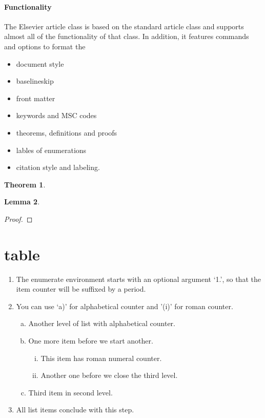 \documentclass[review,number,sort&compress,3p,twocolumn,11pt]{elsarticle} %
\newtheorem{thm}{Theorem}  %
\newtheorem{lem}[thm]{Lemma} %
\begin{document}
\paragraph{Functionality} The Elsevier article class is based on the standard article class and supports almost all of the functionality of that class. In addition, it features commands and options to format the
\begin{itemize}
\item document style
\item baselineskip
\item front matter
\item keywords and MSC codes
\item theorems, definitions and proofs
\item lables of enumerations
\item citation style and labeling.
\end{itemize}
 
\begin{thm}\label{CUMT}
	\lipsum[1]
\end{thm} 


\begin{lem}
	\lipsum[1]
\end{lem} 

\begin{dfn}
	\lipsum[2]
\end{dfn} 	

\begin{rmk}
	\lipsum[2]
\end{rmk} 

\begin{proof}
	\lipsum[2]
\end{proof}

\section{table}
	\begin{enumerate}[1.]
		\item The enumerate environment starts with an optional
		argument ‘1.’, so that the item counter will be suffixed
		by a period.
		\item You can use ‘a)’ for alphabetical counter and ’(i)’ for
		roman counter.
		\begin{enumerate}[a)]
			\item Another level of list with alphabetical counter.
			\item One more item before we start another.
			\begin{enumerate}[(i)]
				\item This item has roman numeral counter.
				\item Another one before we close the third level.
			\end{enumerate}
			\item Third item in second level.
		\end{enumerate}
		\item All list items conclude with this step.
	\end{enumerate}
\end{document}
